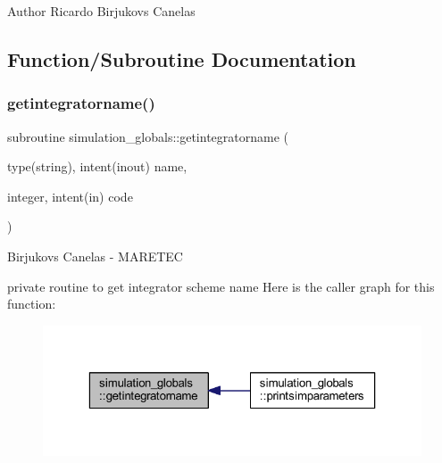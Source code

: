 \begin{DoxyAuthor}{Author}
Ricardo Birjukovs Canelas 
\end{DoxyAuthor}


\subsection{Function/\+Subroutine Documentation}
\mbox{\label{namespacesimulation__globals_a2c6bf88542c503d1da58280ab3dcf772}} 
\subsubsection{\texorpdfstring{getintegratorname()}{getintegratorname()}}
{\footnotesize\ttfamily subroutine simulation\+\_\+globals\+::getintegratorname (\begin{DoxyParamCaption}\item[{type(string), intent(inout)}]{name,  }\item[{integer, intent(in)}]{code }\end{DoxyParamCaption})\hspace{0.3cm}{\ttfamily [private]}}



Birjukovs Canelas -\/ M\+A\+R\+E\+T\+EC 

private routine to get integrator scheme name Here is the caller graph for this function\+:
\nopagebreak
\begin{figure}[H]
\begin{center}
\leavevmode
\includegraphics[width=323pt]{namespacesimulation__globals_a2c6bf88542c503d1da58280ab3dcf772_icgraph}
\end{center}
\end{figure}
\mbox{\label{namespacesimulation__globals_ad90d6959da1d43e2cd1febff82187ed5}} 
